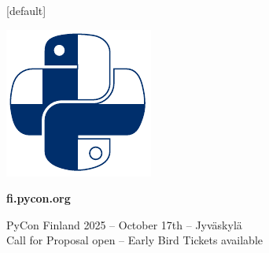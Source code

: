 \documentclass[12pt,aspectratio=169]{beamer}
\begin{document}

[default]
\begin{frame}
\vfill
\huge
\centering \includegraphics[height=0.50\paperheight]{images/PyCon-Finland.pdf}
\par
\textbf{fi.pycon.org}
\par
\normalsize
\vfill
PyCon Finland 2025 – October 17th – Jyväskylä \\
Call for Proposal open – Early Bird Tickets available
\vfill
\end{frame}

\end{document}
